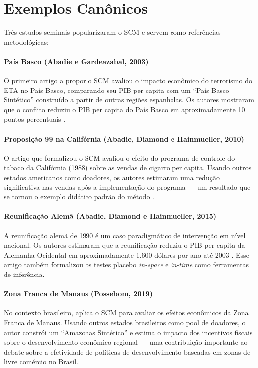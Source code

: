 \documentclass[12pt, a4paper, openany]{book}
\begin{document}
\section{Exemplos Canônicos}

Três estudos seminais popularizaram o SCM e servem como referências metodológicas:

\paragraph{País Basco (Abadie e Gardeazabal, 2003)} O primeiro artigo a propor o SCM avaliou o impacto econômico do terrorismo do ETA no País Basco, comparando seu PIB per capita com um ``País Basco Sintético'' construído a partir de outras regiões espanholas. Os autores mostraram que o conflito reduziu o PIB per capita do País Basco em aproximadamente 10 pontos percentuais \citep{AbadieGardeazabal2003}.

\paragraph{Proposição 99 na Califórnia (Abadie, Diamond e Hainmueller, 2010)} O artigo que formalizou o SCM avaliou o efeito do programa de controle do tabaco da Califórnia (1988) sobre as vendas de cigarro per capita. Usando outros estados americanos como doadores, os autores estimaram uma redução significativa nas vendas após a implementação do programa --- um resultado que se tornou o exemplo didático padrão do método \citep{AbadieDiamondHainmueller2010}.

\paragraph{Reunificação Alemã (Abadie, Diamond e Hainmueller, 2015)} A reunificação alemã de 1990 é um caso paradigmático de intervenção em nível nacional. Os autores estimaram que a reunificação reduziu o PIB per capita da Alemanha Ocidental em aproximadamente 1.600 dólares por ano até 2003 \citep{AbadieDiamondHainmueller2015}. Esse artigo também formalizou os testes placebo \textit{in-space} e \textit{in-time} como ferramentas de inferência.

\paragraph{Zona Franca de Manaus (Possebom, 2019)} No contexto brasileiro, \cite{Possebom2019} aplica o SCM para avaliar os efeitos econômicos da Zona Franca de Manaus. Usando outros estados brasileiros como pool de doadores, o autor constrói um ``Amazonas Sintético'' e estima o impacto dos incentivos fiscais sobre o desenvolvimento econômico regional --- uma contribuição importante ao debate sobre a efetividade de políticas de desenvolvimento baseadas em zonas de livre comércio no Brasil.
\end{document}
